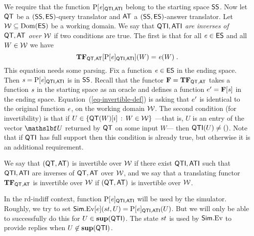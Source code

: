 We require that the function $\mathrm{P}[\mathit{e}]_{\mathsf{QTI},\mathsf{ATI}}$ belong to the starting space $\mathsf{SS}$. Now let $\mathsf{QT}$ be a $(\mathsf{SS},\mathsf{ES})$-query translator and $\mathsf{AT}$ a $(\mathsf{SS},\mathsf{ES})$-answer translator. Let ${\cal W}\subseteq\mathrm{Dom}(\mathsf{ES})$ be a working domain. We say that \textit{$\mathsf{QTI},\mathsf{ATI}$ are inverses of $\mathsf{QT},\mathsf{AT}$ over ${\cal W}$} if two conditions are true. The first is that for all  $\mathit{e}\in\mathsf{ES}$ and all $W \in {\cal W}$ we have
	\begin{equation}
	\mathbf{TF}_{\mathsf{QT},\mathsf{AT}}
	[\mathrm{P}[\mathit{e}]_{\mathsf{QTI},\mathsf{ATI}}](W) = \mathit{e}(W) \;.  \label{eq-invertible-def}
	\end{equation}
This equation needs some parsing. Fix a function $\mathit{e}\in\mathsf{ES}$ in the ending space. Then $\mathit{s} = \mathrm{P}[\mathit{e}]_{\mathsf{QTI},\mathsf{ATI}}$ is in $\mathsf{SS}$. Recall that the functor $\mathbf{F} = \mathbf{TF}_{\mathsf{QT},\mathsf{AT}}$ takes a function $\mathit{s}$ in the starting space as an oracle and defines a function $e' = \mathbf{F}[\mathit{s}]$ in the ending space. Equation~(\ref{eq-invertible-def}) is asking that $e'$ is identical to the original function $e$, on the working domain ${\cal W}$. The second condition (for invertibility) is that if $U\in \{\mathsf{QT}(W)[i] \,:\, W\in{\cal W}\}$ ---that is, $U$ is an entry of the vector $\vecU$ returned by $\mathsf{QT}$ on some input $W$--- then $\mathsf{QTI}(U)\neq ()$. Note that if $\mathsf{QTI}$ has full support then this condition is already true, but otherwise it is an additional requirement.


We say that $(\mathsf{QT},\mathsf{AT})$ is invertible over ${\cal W}$ if there exist $\mathsf{QTI},\mathsf{ATI}$ such that $\mathsf{QTI},\mathsf{ATI}$ are inverses of $\mathsf{QT},\mathsf{AT}$ over ${\cal W}$, and we say that a translating functor $\mathbf{TF}_{\mathsf{QT},\mathsf{AT}}$ is invertible over ${\cal W}$ if $(\mathsf{QT},\mathsf{AT})$ is invertible over ${\cal W}$.

In the rd-indiff context, function $\mathrm{P}[\mathit{e}]_{\mathsf{QTI},\mathsf{ATI}}$ will be used by the simulator. Roughly, we try to set $ \mathsf{Sim}.{\mathrm{Ev}}[e](st, U) = \mathrm{P}[\mathit{e}]_{\mathsf{QTI},\mathsf{ATI}}(U)$. But we will only be able to successfully do this for $U \in \mathbf{sup}(\mathsf{QTI})$. The state $st$ is used by $\mathsf{Sim}.{\mathrm{Ev}}$ to provide replies when $U \not\in \mathbf{sup}(\mathsf{QTI})$. 


